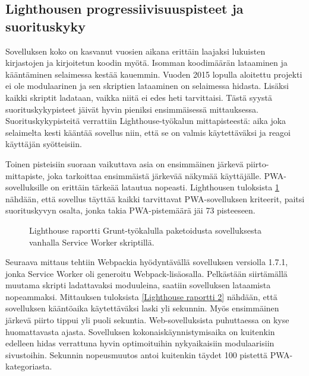 \documentclass{tktltiki}
\begin{document}
\subsection{Lighthousen progressiivisuuspisteet ja suorituskyky}

Sovelluksen koko on kasvanut vuosien aikana erittäin laajaksi lukuisten kirjastojen ja kirjoitetun koodin myötä. Isomman koodimäärän lataaminen ja kääntäminen selaimessa kestää kauemmin. Vuoden 2015 lopulla aloitettu projekti ei ole modulaarinen ja sen skriptien lataaminen on selaimessa hidasta. Lisäksi kaikki skriptit ladataan, vaikka niitä ei edes heti tarvittaisi. Tästä syystä suorituskykypisteet jäivät hyvin pieniksi ensimmäisessä mittauksessa. Suorituskykypisteitä verrattiin Lighthouse-työkalun mittapisteestä: aika joka selaimelta kesti kääntää sovellus niin, että se on valmis käytettäväksi ja reagoi käyttäjän syötteisiin.

Toinen pisteisiin suoraan vaikuttava asia on ensimmäinen järkevä piirto-mittapiste, joka tarkoittaa ensimmäistä järkevää näkymää käyttäjälle. PWA-sovelluksille on erittäin tärkeää latautua nopeasti.  Lighthousen tuloksista \ref{Lighthouse raportti 1} nähdään, että sovellus täyttää kaikki tarvittavat PWA-sovelluksen kriteerit, paitsi suorituskyvyn osalta, jonka takia PWA-pistemäärä jäi 73 pisteeseen.

\begin{figure}[h]
\begin{center}
\caption{Lighthouse raportti Grunt-työkalulla paketoidusta sovelluksesta vanhalla Service Worker skriptillä.}
\label{Lighthouse raportti 1}
\end{center}
\end{figure}

\clearpage

Seuraava mittaus tehtiin Webpackia hyödyntävällä sovelluksen versiolla 1.7.1, jonka Service Worker oli generoitu Webpack-lisäosalla. Pelkästään siirtämällä muutama skripti ladattavaksi moduuleina, saatiin sovelluksen lataamista nopeammaksi. Mittauksen tuloksista \ref{Lighthouse raportti 2} nähdään, että sovelluksen kääntöaika käytettäväksi laski yli sekunnin. Myös ensimmäinen järkevä piirto tippui yli puoli sekuntia. Web-sovelluksista puhuttaessa on kyse huomattavasta ajasta. Sovelluksen kokonaiskäynnistymisaika on kuitenkin edelleen hidas verrattuna hyvin optimoituihin nykyaikaisiin modulaarisiin sivustoihin. Sekunnin nopeusmuutos antoi kuitenkin täydet 100 pistettä PWA-kategoriasta. 
\end{document}
